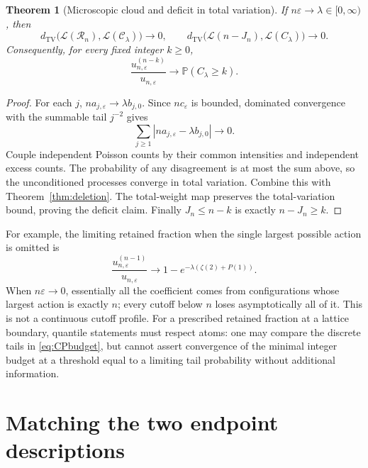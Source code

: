 \documentclass[11pt,a4paper]{article}
\newtheorem{theorem}{Theorem}[section]
\theoremstyle{definition}\newtheorem{definition}[theorem]{Definition}
\theoremstyle{remark}\newtheorem{remark}[theorem]{Remark}
\newcommand{\eps}{\varepsilon}
\newcommand{\Prob}{\mathbb P}
\newcommand{\TV}{d_{\mathrm{TV}}}
\newcommand{\Law}{\mathcal L}
\newcommand{\1}{\mathbf 1}
\begin{document}
\begin{theorem}[Microscopic cloud and deficit in total variation]
\label{thm:CP}
If $n\eps\to\lambda\in[0,\infty)$, then
\begin{equation}\label{eq:CPtv}
 \TV\bigl(\Law(\mathcal R_n),\Law(\mathcal C_\lambda)\bigr)\to0,
 \qquad
 \TV\bigl(\Law(n-J_n),\Law(C_\lambda)\bigr)\to0.
\end{equation}
Consequently, for every fixed integer $k\ge0$,
\begin{equation}\label{eq:CPbudget}
 \frac{u_{n,\eps}^{(n-k)}}{u_{n,\eps}}
 \longrightarrow\Prob(C_\lambda\ge k).
\end{equation}
\end{theorem}
\begin{proof}
For each $j$, $n a_{j,\eps}\to\lambda b_{j,0}$. Since $n c_{\eps}$
is bounded, dominated convergence with the summable tail $j^{-2}$ gives
\[
 \sum_{j\ge1}|n a_{j,\eps}-\lambda b_{j,0}|\longrightarrow0.
\]
Couple independent Poisson counts by their common intensities and
independent excess counts. The probability of any disagreement is at
most the sum above, so the unconditioned processes converge in total
variation. Combine this with Theorem~\ref{thm:deletion}. The total-weight
map preserves the total-variation bound, proving the deficit claim.
Finally $J_n\le n-k$ is exactly $n-J_n\ge k$.
\end{proof}

For example, the limiting retained fraction when the single largest
possible action is omitted is
\begin{equation}\label{eq:lastaction}
 \frac{u_{n,\eps}^{(n-1)}}{u_{n,\eps}}
 \longrightarrow1-e^{-\lambda(\zeta(2)+P(1))}.
\end{equation}
When $n\eps\to0$, essentially all the coefficient comes from
configurations whose largest action is exactly $n$; every cutoff below
$n$ loses asymptotically all of it. This is not a continuous cutoff
profile. For a prescribed retained fraction at a lattice boundary,
quantile statements must respect atoms: one may compare the discrete
tails in \eqref{eq:CPbudget}, but cannot assert convergence of the
minimal integer budget at a threshold equal to a limiting tail
probability without additional information.

\section{Matching the two endpoint descriptions}
\label{sec:matching}
\end{document}
